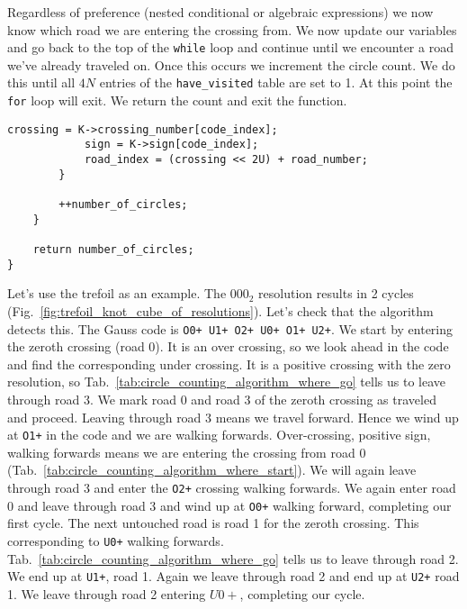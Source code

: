         Regardless of preference (nested conditional or algebraic expressions)
        we now know which road we are entering the crossing from.
        We now update our variables and go back to the top of the
        \texttt{while} loop and continue until
        we encounter a road we've already traveled on. Once this occurs we
        increment the circle count. We do this until all $4N$ entries of the
        \texttt{have\_visited} table are set to 1. At this point the
        \texttt{for} loop will exit. We return the count and exit the function.
\begin{lstlisting}[style=CStyle, firstnumber = 157]
            crossing = K->crossing_number[code_index];
            sign = K->sign[code_index];
            road_index = (crossing << 2U) + road_number;
        }

        ++number_of_circles;
    }

    return number_of_circles;
}
\end{lstlisting}
        Let's use the trefoil as an example. The $000_{2}$ resolution results
        in 2 cycles (Fig.~\ref{fig:trefoil_knot_cube_of_resolutions}). Let's
        check that the algorithm detects this. The Gauss code is
        \texttt{O0+ U1+ O2+ U0+ O1+ U2+}.
        We start by entering the zeroth crossing
        (road 0). It is an over crossing, so we look ahead in the code and
        find the corresponding under crossing. It is a positive crossing with
        the zero resolution, so
        Tab.~\ref{tab:circle_counting_algorithm_where_go} tells
        us to leave through road 3. We mark road 0 and road 3 of the zeroth
        crossing as traveled and proceed. Leaving through road 3 means we
        travel forward. Hence we wind up at \texttt{O1+} in the code and we are
        walking forwards. Over-crossing, positive sign, walking forwards means
        we are entering the crossing from road 0
        (Tab.~\ref{tab:circle_counting_algorithm_where_start}). We will again
        leave through road 3 and enter the \texttt{O2+}
        crossing walking forwards. We again enter road 0 and leave
        through road 3 and wind up at \texttt{O0+} walking forward,
        completing our first cycle. The next untouched
        road is road 1 for the zeroth crossing. This corresponding to
        \texttt{U0+} walking forwards.
        Tab.~\ref{tab:circle_counting_algorithm_where_go}
        tells us to leave through road 2. We end up at \texttt{U1+}, road 1.
        Again we leave through road 2 and end up at \texttt{U2+} road 1.
        We leave through road 2 entering $U0+$, completing our cycle.
